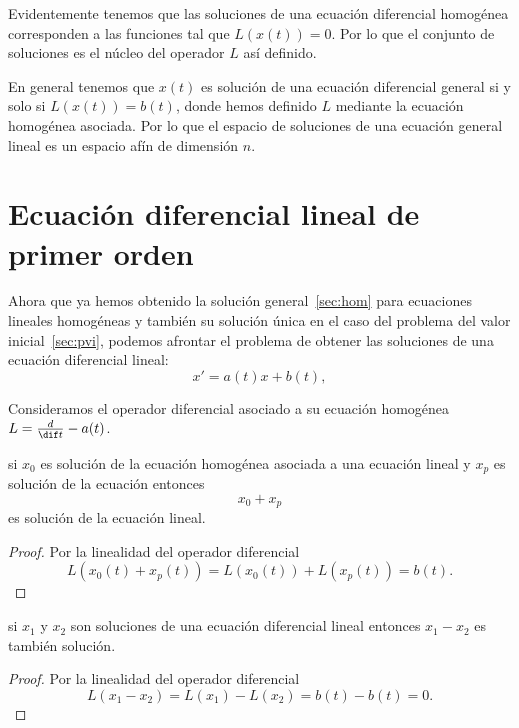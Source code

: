 \documentclass[../main.tex]{subfiles}
\begin{document}
\begin{remark}
	Evidentemente tenemos que las soluciones de una ecuación diferencial 
	homogénea corresponden a las funciones tal que \(L(x(t)) = 0\). Por lo que
	el conjunto de soluciones es el núcleo del operador \(L\) así definido.
\end{remark}

\begin{remark}
	En general tenemos que \(x(t)\) es solución de una ecuación diferencial
	general si y solo si \(L(x(t)) = b(t)\), donde hemos definido \(L\)
	mediante la ecuación homogénea asociada. Por lo que el espacio de 
	soluciones de una ecuación general lineal es un espacio afín de dimensión 
	\(n\).
\end{remark}

\section{Ecuación diferencial lineal de primer orden}

Ahora que ya hemos obtenido la solución general~\autoref{sec:hom} para 
ecuaciones lineales homogéneas y también su solución única en el caso del 
problema del valor inicial~\autoref{sec:pvi}, podemos afrontar el problema de
obtener las soluciones de una ecuación diferencial lineal:
\[x' = a(t)x + b(t),\]

Consideramos el operador diferencial asociado a su ecuación homogénea 
\(L = \frac{d}{\dif t} - a(t)\). 

\begin{lemma}
	si \(x_0\) es solución de la ecuación homogénea asociada a una ecuación 
	lineal y \(x_p\) es solución de la ecuación entonces
	\[x_0 + x_p\] 
	es solución de la ecuación lineal.
\end{lemma}

\begin{proof}
	Por la linealidad del operador diferencial
	\[L(x_0(t) + x_p(t)) = L(x_0(t)) + L(x_p(t)) = b(t).\]
\end{proof}

\begin{lemma}
	si \(x_1\) y \(x_2\) son soluciones de una ecuación diferencial lineal 
	entonces \(x_1 - x_2\) es también solución.
\end{lemma}

\begin{proof}
	Por la linealidad del operador diferencial
	\[L(x_1 - x_2) = L(x_1) - L(x_2) = b(t) - b(t) = 0.\]
\end{proof}
\end{document}
